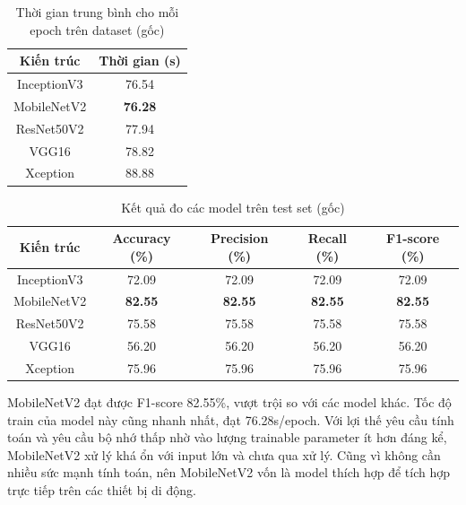 \documentclass[a4paper,14pt]{extarticle}
\begin{document}
		\begin{table}[H]
			\centering
			\begin{tabular}{|c|c|}
			\hline
			Kiến trúc   & Thời gian (s)  \\ \hline
			InceptionV3 & 76.54          \\
			MobileNetV2 & \textbf{76.28} \\
			ResNet50V2  & 77.94          \\
			VGG16       & 78.82          \\
			Xception    & 88.88          \\ \hline
			\end{tabular}
			\caption{Thời gian trung bình cho mỗi epoch trên dataset (gốc)}
		\end{table}

		\begin{table}[H]
			\centering
			\begin{tabular}{|c|c|c|c|c|}
			\hline
			Kiến trúc   & Accuracy (\%)  & Precision (\%) & Recall (\%)    & F1-score (\%)  \\ \hline
			InceptionV3 & 72.09          & 72.09          & 72.09          & 72.09          \\
			MobileNetV2 & \textbf{82.55} & \textbf{82.55} & \textbf{82.55} & \textbf{82.55} \\
			ResNet50V2  & 75.58          & 75.58          & 75.58          & 75.58          \\
			VGG16       & 56.20          & 56.20          & 56.20          & 56.20          \\
			Xception    & 75.96          & 75.96          & 75.96          & 75.96          \\ \hline
			\end{tabular}
			\caption{Kết quả đo các model trên test set (gốc)}
		\end{table}

		MobileNetV2 đạt được F1-score 82.55\%, vượt trội so với các model khác. Tốc độ train của model này cũng nhanh nhất, đạt 76.28s/epoch. Với lợi thế yêu cầu tính toán và yêu cầu bộ nhớ thấp nhờ vào lượng trainable parameter ít hơn đáng kể, MobileNetV2 xử lý khá ổn với input lớn và chưa qua xử lý. Cũng vì không cần nhiều sức mạnh tính toán, nên MobileNetV2 vốn là model thích hợp để tích hợp trực tiếp trên các thiết bị di động.
		
\end{document}
